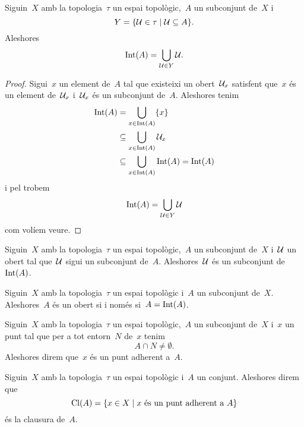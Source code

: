 \documentclass[../../main.tex]{subfiles}
\begin{document}
	\begin{proposition}
		\label{prop:l'interior d'un conjunt és la unió de tots els oberts continguts en el conjunt}
		Siguin~\(X\) amb la topologia~\(\tau\) un espai topològic,~\(A\) un subconjunt de~\(X\) i
		\[
		    Y=\{\mathcal{U}\in\tau\mid\mathcal{U}\subseteq A\}.
		\]
		Aleshores
		\[
		    \operatorname{Int}(A)=\bigcup_{\mathcal{U}\in Y}\mathcal{U}.
		\]
		\begin{proof}
			Sigui~\(x\) un element de~\(A\) tal que existeixi un obert~\(\mathcal{U}_{x}\) satisfent que~\(x\) és un element de~\(\mathcal{U}_{x}\) i~\(\mathcal{U}_{x}\) és un subconjunt de~\(A\).
			Aleshores tenim
			\begin{align*}
				\operatorname{Int}(A)&=\bigcup_{x\in\operatorname{Int}(A)}\{x\} \\
				&\subseteq\bigcup_{x\in\operatorname{Int}(A)}\mathcal{U}_{x} \\
				&\subseteq\bigcup_{x\in\operatorname{Int}(A)}\operatorname{Int}(A)=\operatorname{Int}(A)
			\end{align*}
			i pel  trobem
			\[
			    \operatorname{Int}(A)=\bigcup_{\mathcal{U}\in Y}\mathcal{U}
			\]
			com volíem veure.
		\end{proof}
	\end{proposition}
	\begin{corollary}
		\label{cor:l'interior d'un conjunt conté tots els seus oberts}
		Siguin~\(X\) amb la topologia~\(\tau\) un espai topològic,~\(A\) un subconjunt de~\(X\) i~\(\mathcal{U}\) un obert tal que~\(\mathcal{U}\) sigui un subconjunt de~\(A\).
		Aleshores~\(\mathcal{U}\) és un subconjunt de~\(\operatorname{Int}(A)\).
	\end{corollary}
	\begin{corollary}
		\label{cor:un conjunt és obert si i només si és el seu interior}
		Siguin~\(X\) amb la topologia~\(\tau\) un espai topològic i~\(A\) un subconjunt de~\(X\).
		Aleshores~\(A\) és un obert si i només si~\(A=\operatorname{Int}(A)\).
	\end{corollary}
	\begin{definition}
		\label{def:punt adherent}
		Siguin~\(X\) amb la topologia~\(\tau\) un espai topològic,~\(A\) un subconjunt de~\(X\) i~\(x\) un punt tal que per a tot entorn~\(N\) de~\(x\) tenim
		\[
		    A\cap N\neq\emptyset.
		\]
		Aleshores direm que~\(x\) és un punt adherent a~\(A\).
	\end{definition}
	\begin{definition}[Clausura]
		\label{def:clausura}
		Siguin~\(X\) amb la topologia~\(\tau\) un espai topològic i~\(A\) un conjunt.
		Aleshores direm que
		\[
		    \operatorname{Cl}(A)=\{x\in X\mid x\text{ és un punt adherent a }A\}
		\]
		és la clausura de~\(A\).
	\end{definition}
\end{document}

